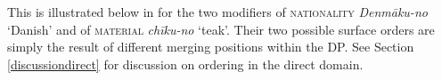 This is illustrated below in  for the two modifiers of \textsc{nationality} \textit{Denmāku-no} `Danish’ and of \textsc{material} \textit{chīku-no} `teak’. Their two possible surface orders are simply the result of different merging positions within the DP. See Section \ref{discussiondirect} for discussion on ordering in the direct domain.

%
%
%
%

